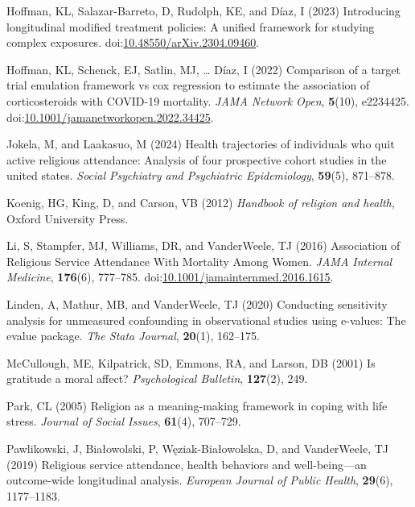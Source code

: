 \documentclass[
  single column]{article}
\newlength{\cslhangindent}
\newenvironment{CSLReferences}[2] %
 {\begin{list}{}{%
  \setlength{\itemindent}{0pt}
  \setlength{\leftmargin}{0pt}
  \setlength{\parsep}{0pt}
  \ifodd #1
   \setlength{\leftmargin}{\cslhangindent}
   \setlength{\itemindent}{-1\cslhangindent}
  \fi
  \setlength{\itemsep}{#2\baselineskip}}}
 {\end{list}}
\begin{document}
\begin{CSLReferences}{1}{0}
Hoffman, KL, Salazar-Barreto, D, Rudolph, KE, and Díaz, I (2023)
Introducing longitudinal modified treatment policies: A unified
framework for studying complex exposures.
doi:\href{https://doi.org/10.48550/arXiv.2304.09460}{10.48550/arXiv.2304.09460}.

Hoffman, KL, Schenck, EJ, Satlin, MJ, \ldots{} Díaz, I (2022) Comparison
of a target trial emulation framework vs cox regression to estimate the
association of corticosteroids with COVID-19 mortality. \emph{JAMA
Network Open}, \textbf{5}(10), e2234425.
doi:\href{https://doi.org/10.1001/jamanetworkopen.2022.34425}{10.1001/jamanetworkopen.2022.34425}.

Jokela, M, and Laakasuo, M (2024) Health trajectories of individuals who
quit active religious attendance: Analysis of four prospective cohort
studies in the united states. \emph{Social Psychiatry and Psychiatric
Epidemiology}, \textbf{59}(5), 871--878.

Koenig, HG, King, D, and Carson, VB (2012) \emph{Handbook of religion
and health}, Oxford University Press.

Li, S, Stampfer, MJ, Williams, DR, and VanderWeele, TJ (2016)
{Association of Religious Service Attendance With Mortality Among
Women}. \emph{JAMA Internal Medicine}, \textbf{176}(6), 777--785.
doi:\href{https://doi.org/10.1001/jamainternmed.2016.1615}{10.1001/jamainternmed.2016.1615}.

Linden, A, Mathur, MB, and VanderWeele, TJ (2020) Conducting sensitivity
analysis for unmeasured confounding in observational studies using
e-values: The evalue package. \emph{The Stata Journal}, \textbf{20}(1),
162--175.

McCullough, ME, Kilpatrick, SD, Emmons, RA, and Larson, DB (2001) Is
gratitude a moral affect? \emph{Psychological Bulletin},
\textbf{127}(2), 249.

Park, CL (2005) Religion as a meaning-making framework in coping with
life stress. \emph{Journal of Social Issues}, \textbf{61}(4), 707--729.

Pawlikowski, J, Białowolski, P, Węziak-Białowolska, D, and VanderWeele,
TJ (2019) Religious service attendance, health behaviors and
well-being---an outcome-wide longitudinal analysis. \emph{European
Journal of Public Health}, \textbf{29}(6), 1177--1183.


\end{CSLReferences}
\end{document}
